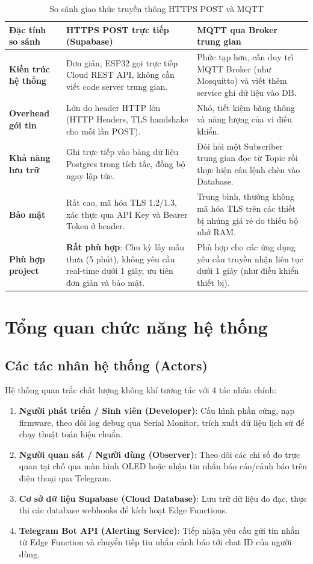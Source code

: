 \begin{table}[H]
\centering
\caption{So sánh giao thức truyền thông HTTPS POST và MQTT}
\label{tab:httpvsmqtt}
\begin{small}
\begin{tabular}{lp{6.0cm}p{6.0cm}}
\toprule
\textbf{Đặc tính so sánh} & \textbf{HTTPS POST trực tiếp (Supabase)} & \textbf{MQTT qua Broker trung gian} \\
\midrule
\textbf{Kiến trúc hệ thống} & Đơn giản, ESP32 gọi trực tiếp Cloud REST API, không cần viết code server trung gian. & Phức tạp hơn, cần duy trì MQTT Broker (như Mosquitto) và viết thêm service ghi dữ liệu vào DB. \\
\midrule
\textbf{Overhead gói tin} & Lớn do header HTTP lớn (HTTP Headers, TLS handshake cho mỗi lần POST). & Nhỏ, tiết kiệm băng thông và năng lượng của vi điều khiển. \\
\midrule
\textbf{Khả năng lưu trữ} & Ghi trực tiếp vào bảng dữ liệu Postgres trong tích tắc, đồng bộ ngay lập tức. & Đòi hỏi một Subscriber trung gian đọc từ Topic rồi thực hiện câu lệnh chèn vào Database. \\
\midrule
\textbf{Bảo mật} & Rất cao, mã hóa TLS 1.2/1.3, xác thực qua API Key và Bearer Token ở header. & Trung bình, thường không mã hóa TLS trên các thiết bị nhúng giá rẻ do thiếu bộ nhớ RAM. \\
\midrule
\textbf{Phù hợp project} & \textbf{Rất phù hợp}: Chu kỳ lấy mẫu thưa (5 phút), không yêu cầu real-time dưới 1 giây, ưu tiên đơn giản và bảo mật. & Phù hợp cho các ứng dụng yêu cầu truyền nhận liên tục dưới 1 giây (như điều khiển thiết bị). \\
\bottomrule
\end{tabular}
\end{small}
\end{table}

\section{Tổng quan chức năng hệ thống}
\subsection{Các tác nhân hệ thống (Actors)}
Hệ thống quan trắc chất lượng không khí tương tác với 4 tác nhân chính:
\begin{enumerate}
    \item \textbf{Người phát triển / Sinh viên (Developer)}: Cấu hình phần cứng, nạp firmware, theo dõi log debug qua Serial Monitor, trích xuất dữ liệu lịch sử để chạy thuật toán hiệu chuẩn.
    \item \textbf{Người quan sát / Người dùng (Observer)}: Theo dõi các chỉ số đo trực quan tại chỗ qua màn hình OLED hoặc nhận tin nhắn báo cáo/cảnh báo trên điện thoại qua Telegram.
    \item \textbf{Cơ sở dữ liệu Supabase (Cloud Database)}: Lưu trữ dữ liệu đo đạc, thực thi các database webhooks để kích hoạt Edge Functions.
    \item \textbf{Telegram Bot API (Alerting Service)}: Tiếp nhận yêu cầu gửi tin nhắn từ Edge Function và chuyển tiếp tin nhắn cảnh báo tới chat ID của người dùng.
\end{enumerate}

